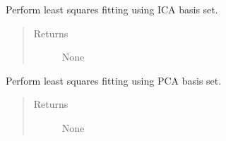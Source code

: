 \documentclass[a4paper,12pt,english]{sphinxmanual}
\begin{document}

\begin{fulllineitems}
\label{analysis:analysis.fitPSF.ICAleastSq}
Perform least squares fitting using ICA basis set.
\begin{quote}\begin{description}
\item[{Returns}] \leavevmode
None

\end{description}\end{quote}

\end{fulllineitems}


\begin{fulllineitems}
\label{analysis:analysis.fitPSF.PCAleastSQ}
Perform least squares fitting using PCA basis set.
\begin{quote}\begin{description}
\item[{Returns}] \leavevmode
None

\end{description}\end{quote}

\end{fulllineitems}

\end{document}
